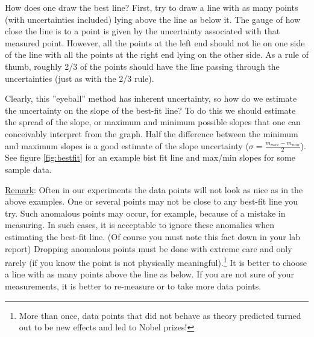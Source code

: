 How does one draw the best line?  First, try to draw a line with as many points (with uncertainties included) lying above the line as below it. The gauge of how close the line is to a point is given by the uncertainty associated with that measured point. However, all the points at the left end should not lie on one side of the line with all the points at the right end lying on the other side. As a rule of thumb, roughly 2/3 of the points should have the line passing through the uncertainties (just as with the 2/3 rule).\myskip

Clearly, this ''eyeball'' method has inherent uncertainty, so how do we estimate the uncertainty on the slope of the best-fit line? To do this we should estimate the spread of the slope, or maximum and minimum possible slopes that one can conceivably interpret from the graph. Half the difference between the minimum and maximum slopes is a good estimate of the slope uncertainty ($\sigma=\frac{m_{max}-m_{min}}{2}$). See figure \ref{fig:bestfit} for an example bist fit line and max/min slopes for some sample data.  \myskip

\underline{Remark}: Often in our experiments the data points will not look as nice as in the above examples. One or several points may not be close to any best-fit line you try. Such anomalous points may occur, for example, because of a mistake in measuring. In such cases, it is acceptable to ignore these anomalies when estimating the best-fit line. (Of course you must note this fact down in your lab report)  Dropping anomalous points must be done with extreme care and only rarely (if you know the point is not physically meaningful).\footnote{More than once, data points that did not behave as theory predicted turned out to be new effects and led to Nobel prizes!}  It is better to choose a line with as many points above the line as below. If you are not sure of your measurements, it is better to re-measure or to take more data points. \myskip


